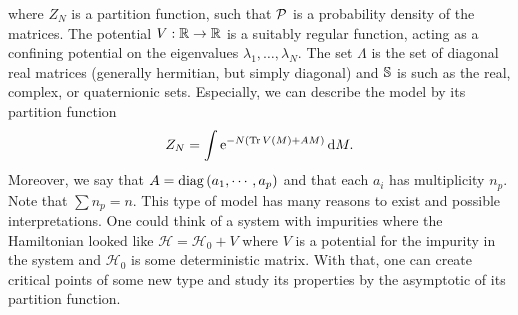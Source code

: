 where $Z_{N}$ is a partition function, such that $\mathcal{P}$ is a probability density of the matrices. The potential $V:\mathbb {\mathbb{R}} \to \mathbb{R}$ is a suitably regular function, acting as a confining potential on the eigenvalues $\lambda_1,\hdots, \lambda_N$. The set $\Lambda$ is the set of diagonal real matrices (generally hermitian, but simply diagonal) and $\mathbb{S}$ is such as the real, complex, or quaternionic sets.  Especially, we can describe the model by its partition function
\begin{equation}
		Z_{N} = \int \operatorname{e}^{- N \left( \operatorname{Tr}{V(M)} + AM \right)} \mathrm{d} M.
\end{equation}
Moreover, we say that $A = \operatorname{diag}{(a_1, \cdots, a_p)}$ and that each $a_i$ has multiplicity $n_p$. Note that $\sum n_p = n$.  This type of model has many reasons to exist and possible interpretations. One could think of a system with impurities where the Hamiltonian looked like $\mathcal{H}= \mathcal{H}_0 + V$ where $V$ is a potential for the impurity in the system and $\mathcal{H}_0$ is some deterministic matrix. With that, one can create critical points of some new type and study its properties by the asymptotic of its partition function. 

